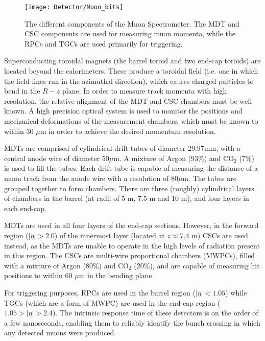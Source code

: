 \begin{figure}[tb]
\begin{center}
\texttt{[image: Detector/Muon\_bits]}
\end{center}
\caption[Components of the Muoin Spectrometer.]{The different components of the Muon Spectrometer. The MDT and CSC components are used for measuring muon momenta, while the RPCs and TGCs are used primarily for triggering.}
\label{fig_Muon_bits}
\end{figure}


Superconducting toroidal magnets (the barrel toroid and two end-cap toroids) are located beyond the calorimeters. 
These produce a toroidal field (i.e. one in which the field lines run in the azimuthal direction), which causes charged particles to bend in the $R-z$ plane. In order to measure track momenta with high resolution, the relative alignment of the MDT and CSC chambers must be well known. A high precision optical system is used to monitor the positions and mechanical deformations of the measurement chambers, which must be known to within 30 $\mu$m in order to achieve the desired momentum resolution.

MDTs are comprised of cylindrical drift tubes of diameter 29.97mm, with a central anode wire of diameter 50$\mu$m. A mixture of Argon (93\%) and $\mathrm{CO}_2$ (7\%) is used to fill the tubes. Each drift tube is capable of measuring the distance of a muon track from the anode wire with a resolution of 80$\mu$m. The tubes are grouped together to form chambers. There are three (roughly) cylindrical layers of chambers in the barrel (at radii of 5 m, 7.5 m and 10 m), and four layers in each end-cap.



MDTs are used in all four layers of the end-cap sections. However, in the forward region ($|\eta | > 2.0$) of the innermost layer (located at $z \approx 7.4$ m) CSCs are used instead, as the MDTs are unable to operate in the high levels of radiation present in this region. The CSCs are multi-wire proportional chambers (MWPCs), filled with a mixture of Argon (80\%) and $\mathrm{CO}_2$ (20\%), and are capable of measuring hit positions to within 60 $\mu$m in the bending plane.

For triggering purposes, RPCs are used in the barrel region ($|\eta| < 1.05$) while TGCs (which are a form of MWPC) are used in the end-cap region ($1.05 > |\eta| > 2.4$). The intrinsic response time of these detectors is on the order of a few nanoseconds, enabling them to reliably identify the bunch crossing in which any detected muons were produced.
